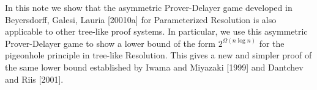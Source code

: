 

In this note we show that the asymmetric Prover-Delayer game developed in
Beyersdorff, Galesi, Lauria [20010a] for Parameterized Resolution is also
applicable to other tree-like proof systems.  In particular, we use this
asymmetric Prover-Delayer game to show a lower bound of the form
$2^{\Omega(n\log n)}$ for the pigeonhole principle in tree-like Resolution.
This gives a new and simpler proof of the same lower bound established by Iwama
and Miyazaki [1999] and Dantchev and Riis [2001].
